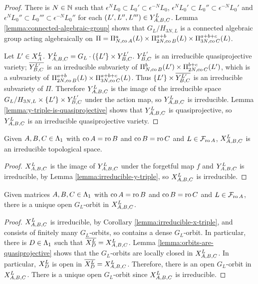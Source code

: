 \documentclass[a4paper, 11pt]{report}
\begin{document}
\begin{proof}
There is $N\in\naturals$ such that $\epsilon^N L_0\subset L_0'\subset\epsilon^{-N}L_0$, $\epsilon^N L_0'\subset L_0''\subset\epsilon^{-N}L_0'$ and $\epsilon^N L_0''\subset L_0'''\subset\epsilon^{-N}L_0''$ for each $(L',L'',L''')\in\yprod[L]{A,B,C}$. Lemma \ref{lemma:connected-algebraic-group} shows that $G_L/{H_{3N,L}}$ is a connected algebraic group acting algebraically on $\Pi = \Pi_{N,\co{A}}^a(L)\times\Pi_{2N,\co{B}}^{a+b}(L)\times\Pi_{3N,\co{C}}^{a+b+c}(L)$.

Let $L'\in\xprod[L]{A}$. $\yprod[L]{A,B,C} = G_L\cdot (\{L'\}\times\yprod[L']{B,C}$. $\yprod[L']{B,C}$ is an irreducible quasiprojective variety; $\overline{\yprod[L']{B,C}}$ is an irreducible subvariety of $\Pi_{N,\co{B}}^b(L')\times\Pi_{2N,\co{C}}^{b+c}(L')$, which is a subvariety of $\Pi_{2N,\co{B}}^{a+b}(L)\times\Pi_{3N,\co{C}}^{a+b+c}(L)$. Thus $\{L'\}\times\overline{\yprod[L']{B,C}}$ is an irreducible subvariety of $\Pi$. Therefore $\yprod[L]{A,B,C}$ is the image of the irreducible space $G_L/{H_{3N,L}}\times\{L'\}\times\yprod[L']{B,C}$ under the action map, so $\yprod[L]{A,B,C}$ is irreducible. Lemma \ref{lemma:y-triple-is-quasiprojective} shows that $\yprod[L]{A,B,C}$ is quasiprojective, so $\yprod[L]{A,B,C}$ is an irreducible quasiprojective variety.
\end{proof}

\begin{corollary}\label{lemma:irreducible-x-triple}
Given $A,B,C\in\matrices$ with $\co{A}=\ro{B}$ and $\co{B}=\ro{C}$ and $L\in\flags_{\ro{A}}$, $\xprod[L]{A,B,C}$ is an irreducible topological space.
\end{corollary}

\begin{proof}
$\xprod[L]{A,B,C}$ is the image of $\yprod[L]{A,B,C}$ under the forgetful map $f$ and $\yprod[L]{A,B,C}$ is irreducible, by Lemma \ref{lemma:irreducible-y-triple}, so $\xprod[L]{A,B,C}$ is irreducible.
\end{proof}

\begin{lemma}\label{lemma:generic-triple-product}
Given matrices $A,B,C\in\matrices$ with $\co{A}=\ro{B}$ and $\co{B}=\ro{C}$ and $L\in\flags_{\ro{A}}$, there is a unique open $G_L$-orbit in $\xprod[L]{A,B,C}$.
\end{lemma}

\begin{proof}
$\xprod[L]{A,B,C}$ is irreducible, by Corollary \ref{lemma:irreducible-x-triple}, and consists of finitely many $G_L$-orbits, so contains a dense $G_L$-orbit. In particular, there is $D\in\matrices$ such that $\overline{\xprod[L]{D}}=\xprod[L]{A,B,C}$. Lemma \ref{lemma:orbits-are-quasiprojective} shows that the $G_L$-orbits are locally closed in $\xprod[L]{A,B,C}$. In particular, $\xprod[L]{D}$ is open in $\overline{\xprod[L]{D}} = \xprod[L]{A,B,C}$. Therefore, there is an open $G_L$-orbit in $\xprod[L]{A,B,C}$. There is a unique open $G_L$-orbit since $\xprod[L]{A,B,C}$ is irreducible.
\end{proof}
\end{document}
